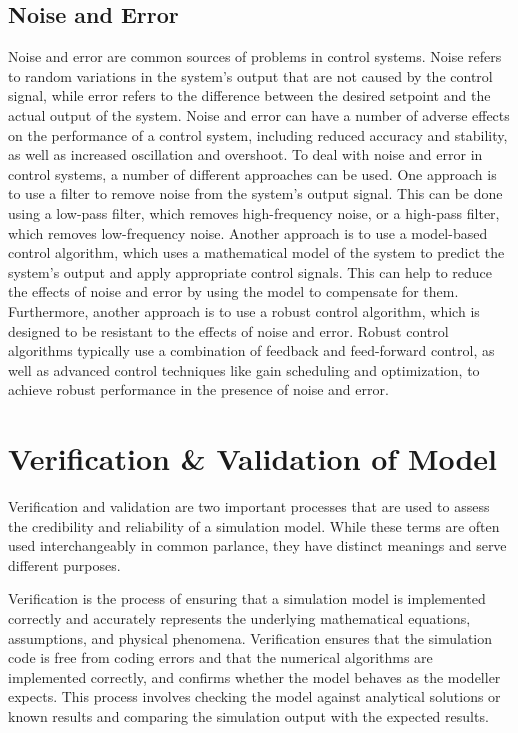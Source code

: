 \subsection{Noise and Error}
Noise and error are common sources of problems in control systems. Noise refers to random variations in the system's output that are not caused by the control signal, while error refers to the difference between the desired setpoint and the actual output of the system. Noise and error can have a number of adverse effects on the performance of a control system, including reduced accuracy and stability, as well as increased oscillation and overshoot. To deal with noise and error in control systems, a number of different approaches can be used. One approach is to use a filter to remove noise from the system's output signal. This can be done using a low-pass filter, which removes high-frequency noise, or a high-pass filter, which removes low-frequency noise. Another approach is to use a model-based control algorithm, which uses a mathematical model of the system to predict the system's output and apply appropriate control signals. This can help to reduce the effects of noise and error by using the model to compensate for them. Furthermore, another approach is to use a robust control algorithm, which is designed to be resistant to the effects of noise and error. Robust control algorithms typically use a combination of feedback and feed-forward control, as well as advanced control techniques like gain scheduling and optimization, to achieve robust performance in the presence of noise and error.

\section{Verification \& Validation of Model}
Verification and validation are two important processes that are used to assess the credibility and reliability of a simulation model. While these terms are often used interchangeably in common parlance, they have distinct meanings and serve different purposes.

Verification is the process of ensuring that a simulation model is implemented correctly and accurately represents the underlying mathematical equations, assumptions, and physical phenomena. Verification ensures that the simulation code is free from coding errors and that the numerical algorithms are implemented correctly, and confirms whether the model behaves as the modeller expects. This process involves checking the model against analytical solutions or known results and comparing the simulation output with the expected results.

